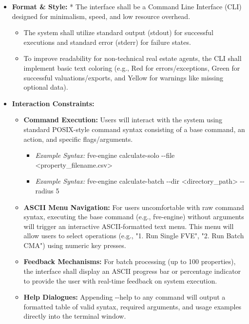 \begin{itemize}
\item
  \textbf{Format \& Style:} * The interface shall be a Command Line
  Interface (CLI) designed for minimalism, speed, and low resource
  overhead.

  \begin{itemize}
  \item
    The system shall utilize standard output (stdout) for successful
    executions and standard error (stderr) for failure states.
  \item
    To improve readability for non-technical real estate agents, the CLI
    shall implement basic text coloring (e.g., Red for
    errors/exceptions, Green for successful valuations/exports, and
    Yellow for warnings like missing optional data).
  \end{itemize}
\item
  \textbf{Interaction Constraints:}

  \begin{itemize}
  \item
    \textbf{Command Execution:} Users will interact with the system
    using standard POSIX-style command syntax consisting of a base
    command, an action, and specific flags/arguments.

    \begin{itemize}
    \item
      \emph{Example Syntax:} fve-engine calculate-solo -\/-file
      \textless property\_filename.csv\textgreater{}
    \item
      \emph{Example Syntax:} fve-engine calculate-batch -\/-dir
      \textless directory\_path\textgreater{} -\/-radius 5
    \end{itemize}
  \item
    \textbf{ASCII Menu Navigation:} For users uncomfortable with raw
    command syntax, executing the base command (e.g., fve-engine)
    without arguments will trigger an interactive ASCII-formatted text
    menu. This menu will allow users to select operations (e.g., "1. Run
    Single FVE", "2. Run Batch CMA") using numeric key presses.
  \item
    \textbf{Feedback Mechanisms:} For batch processing (up to 100
    properties), the interface shall display an ASCII progress bar or
    percentage indicator to provide the user with real-time feedback on
    system execution.
  \item
    \textbf{Help Dialogues:} Appending -\/-help to any command will
    output a formatted table of valid syntax, required arguments, and
    usage examples directly into the terminal window.
  \end{itemize}
\end{itemize}


